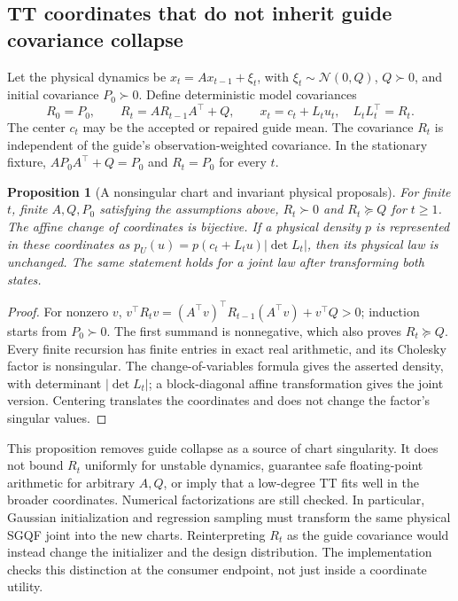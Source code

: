 \documentclass[11pt]{article}
\newtheorem{proposition}{Proposition}
\begin{document}
\subsection{TT coordinates that do not inherit guide covariance collapse}

Let the physical dynamics be $x_t=A x_{t-1}+\xi_t$, with
$\xi_t\sim\mathcal N(0,Q)$, $Q\succ0$, and initial covariance
$P_0\succ0$. Define deterministic model covariances
\begin{equation}
 R_0=P_0,\qquad R_t=A R_{t-1}A^\top+Q,\qquad
 x_t=c_t+L_t u_t,\quad L_tL_t^\top=R_t .
 \label{eq:robust-chart}
\end{equation}
The center $c_t$ may be the accepted or repaired guide mean. The covariance
$R_t$ is independent of the guide's observation-weighted covariance. In the
stationary fixture, $A P_0A^\top+Q=P_0$ and $R_t=P_0$ for every $t$.

\begin{proposition}[A nonsingular chart and invariant physical proposals]
\label{prop:robust-chart}
For finite $t$, finite $A,Q,P_0$ satisfying the assumptions above,
$R_t\succ0$ and $R_t\succeq Q$ for $t\ge1$.
The affine change of coordinates is bijective. If a physical density $p$
is represented in these coordinates as
$p_U(u)=p(c_t+L_tu)|\det L_t|$, then its physical law is unchanged.
The same statement holds for a joint law after transforming both states.
\end{proposition}
\begin{proof}
For nonzero $v$,
$v^\top R_tv=(A^\top v)^\top R_{t-1}(A^\top v)+v^\top Q>0$;
induction starts from $P_0\succ0$. The first summand is nonnegative, which
also proves $R_t\succeq Q$. Every finite recursion has finite entries in
exact real arithmetic, and its Cholesky factor is nonsingular. The
change-of-variables formula gives the asserted density, with determinant
$|\det L_t|$; a block-diagonal affine transformation gives the joint
version. Centering translates the coordinates and does not change the
factor's singular values.
\end{proof}

This proposition removes guide collapse as a source of chart singularity.
It does not bound $R_t$ uniformly for unstable dynamics, guarantee safe
floating-point arithmetic for arbitrary $A,Q$, or imply that a low-degree
TT fits well in the broader coordinates. Numerical factorizations are still
checked. In particular, Gaussian initialization and regression sampling must
transform the same physical SGQF joint into the new charts. Reinterpreting
$R_t$ as the guide covariance would instead change the initializer and
the design distribution. The implementation checks this distinction at the
consumer endpoint, not just inside a coordinate utility.
\end{document}
